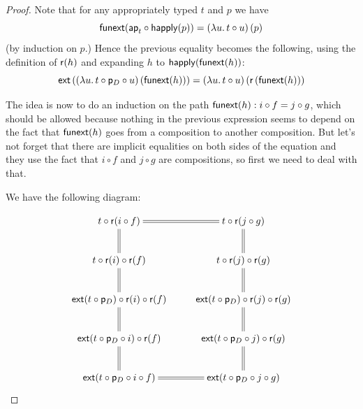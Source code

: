\begin{proof}
  Note that for any appropriately typed $t$ and $p$ we have
  \[\mathsf{funext}(\mathsf{ap}_{t}\circ\mathsf{happly}(p))={(\lambda{}u.\,t\circ{}u)}\left({p}\right)\]
  (by induction on $p$.)
  Hence the previous equality becomes the following, using the definition of
  $\mathsf{r}(h)$ and expanding $h$ to $\mathsf{happly}(\mathsf{funext}(h))$:
  \[{\mathsf{ext}}\left({{(\lambda{}u.\,t\circ\mathsf{p}_D\circ{}u)}\left({\mathsf{funext}(h)}\right)}\right)=
  {(\lambda{}u.\,t\circ{}u)}\left({{\mathsf{r}}\left({\mathsf{funext}(h)}\right)}\right)\]

  The idea is now to do an induction on the path $\mathsf{funext}(h):i\circ f = j\circ
  g$, which should be allowed because nothing in the previous expression seems to
  depend on the fact that $\mathsf{funext}(h)$ goes from a composition to another
  composition.  But let's not forget that there are implicit equalities on
  both sides of the equation and they use the fact that $i\circ f$ and
  $j\circ g$ are compositions, so first we need to deal with that.






  \bigskip

  We have the following diagram:

  \[\xymatrix{
    t\circ\reflect(i\circ f) \ar@{=}[r] \ar@{=}[d] &
      t\circ\reflect(j\circ g) \ar@{=}[d] \\
    t\circ\reflect(i)\circ\reflect(f) \ar@{=}[d] &
      t\circ\reflect(j)\circ\reflect(g) \ar@{=}[d] \\
    \extend{t\circ\project_D}\circ\reflect(i)\circ\reflect(f) \ar@{=}[d] &
      \extend{t\circ\project_D}\circ\reflect(j)\circ\reflect(g) \ar@{=}[d] \\
    \extend{t\circ\project_D\circ i}\circ\reflect(f) \ar@{=}[d] &
      \extend{t\circ\project_D\circ j}\circ\reflect(g) \ar@{=}[d] \\
    \extend{t\circ\project_D\circ i\circ f} \ar@{=}[r] &
      \extend{t\circ\project_D\circ j\circ g}\\
  }\]


\end{proof}
